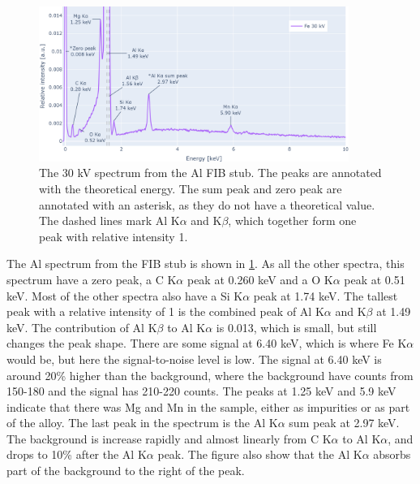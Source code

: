 \begin{figure}[b!]
    \centering
    \includegraphics[width=0.90\textwidth]{figures/each_spectra/Al_everything.png}
    \caption{
        The 30 kV spectrum from the Al FIB stub.
        The peaks are annotated with the theoretical energy.
        The sum peak and zero peak are annotated with an asterisk, as they do not have a theoretical value.
        The dashed lines mark Al K$\alpha$ and K$\beta$, which together form one peak with relative intensity 1.
    }
    \label{fig:results:Spectra_Al}
\end{figure}
The Al spectrum from the FIB stub is shown in \cref{fig:results:Spectra_Al}.
As all the other spectra, this spectrum have a zero peak, a C K$\alpha$ peak at 0.260 keV and a O K$\alpha$ peak at 0.51 keV.
Most of the other spectra also have a Si K$\alpha$ peak at 1.74 keV.
The tallest peak with a relative intensity of 1 is the combined peak of Al K$\alpha$ and K$\beta$ at 1.49 keV.
The contribution of Al K$\beta$ to Al K$\alpha$ is 0.013, which is small, but still changes the peak shape.
There are some signal at 6.40 keV, which is where Fe K$\alpha$ would be, but here the signal-to-noise level is low.
The signal at 6.40 keV is around 20\% higher than the background, where the background have counts from 150-180 and the signal has 210-220 counts.
The peaks at 1.25 keV and 5.9 keV indicate that there was Mg and Mn in the sample, either as impurities or as part of the alloy.
The last peak in the spectrum is the Al K$\alpha$ sum peak at 2.97 keV. %
The background is increase rapidly and almost linearly from C K$\alpha$ to Al K$\alpha$, and drops to 10\% after the Al K$\alpha$ peak.
The figure also show that the Al K$\alpha$ absorbs part of the background to the right of the peak.




